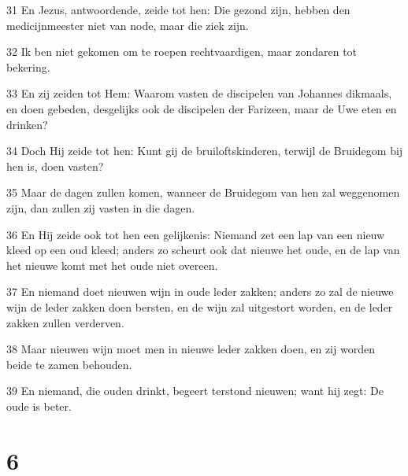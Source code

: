\par 31 En Jezus, antwoordende, zeide tot hen: Die gezond zijn, hebben den medicijnmeester niet van node, maar die ziek zijn.
\par 32 Ik ben niet gekomen om te roepen rechtvaardigen, maar zondaren tot bekering.
\par 33 En zij zeiden tot Hem: Waarom vasten de discipelen van Johannes dikmaals, en doen gebeden, desgelijks ook de discipelen der Farizeen, maar de Uwe eten en drinken?
\par 34 Doch Hij zeide tot hen: Kunt gij de bruiloftskinderen, terwijl de Bruidegom bij hen is, doen vasten?
\par 35 Maar de dagen zullen komen, wanneer de Bruidegom van hen zal weggenomen zijn, dan zullen zij vasten in die dagen.
\par 36 En Hij zeide ook tot hen een gelijkenis: Niemand zet een lap van een nieuw kleed op een oud kleed; anders zo scheurt ook dat nieuwe het oude, en de lap van het nieuwe komt met het oude niet overeen.
\par 37 En niemand doet nieuwen wijn in oude leder zakken; anders zo zal de nieuwe wijn de leder zakken doen bersten, en de wijn zal uitgestort worden, en de leder zakken zullen verderven.
\par 38 Maar nieuwen wijn moet men in nieuwe leder zakken doen, en zij worden beide te zamen behouden.
\par 39 En niemand, die ouden drinkt, begeert terstond nieuwen; want hij zegt: De oude is beter.

\chapter{6}

